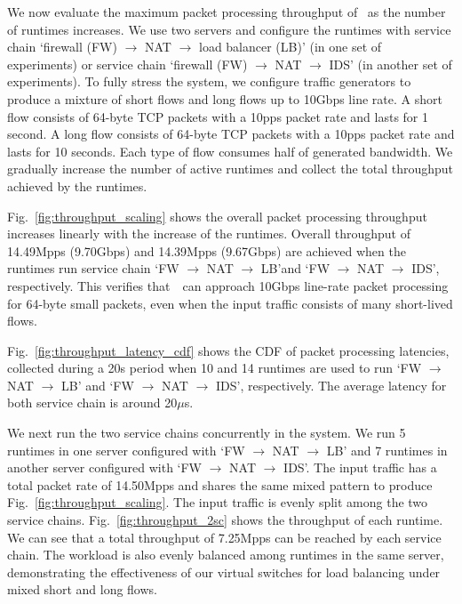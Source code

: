 We now evaluate the maximum packet processing throughput of \nfactor~as the number of runtimes increases. We use two servers and configure the runtimes with service chain `firewall (FW) $\rightarrow$ NAT $\rightarrow$ load balancer (LB)' (in one set of experiments) or service chain `firewall (FW) $\rightarrow$ NAT $\rightarrow$ IDS' (in another set of experiments). To fully stress the system, we configure traffic generators to produce a mixture of short flows and long flows up to 10Gbps line rate. A short flow consists of 64-byte TCP packets with a 10pps packet rate and lasts for 1 second. A long flow consists of 64-byte TCP packets with a 10pps packet rate and lasts for 10 seconds. Each type of flow consumes half of generated bandwidth. We gradually increase the number of active runtimes and collect the total throughput achieved by the runtimes.

Fig.~\ref{fig:throughput_scaling} shows the overall packet processing throughput increases linearly with the increase of the runtimes. Overall throughput of 14.49Mpps (9.70Gbps) and 14.39Mpps (9.67Gbps) are achieved when the runtimes run service chain `FW $\rightarrow$ NAT $\rightarrow$ LB'and `FW $\rightarrow$ NAT $\rightarrow$ IDS', respectively.
This verifies that~\nfactor~can approach 10Gbps line-rate packet processing for 64-byte small packets, even when the input traffic consists of many short-lived flows. %

Fig.~\ref{fig:throughput_latency_cdf} shows the CDF of packet processing latencies, collected during a 20s period when 10 and 14 runtimes are used to run `FW $\rightarrow$ NAT $\rightarrow$ LB' and `FW $\rightarrow$ NAT $\rightarrow$ IDS', respectively. The average latency for both service chain is around 20$\mu$s.

We next run the two service chains concurrently in the system. We run 5 runtimes in one server configured with `FW $\rightarrow$ NAT $\rightarrow$ LB' and 7 runtimes in another server configured with `FW $\rightarrow$ NAT $\rightarrow$ IDS'. The input traffic has a total packet rate of 14.50Mpps and shares the same mixed pattern to produce Fig.~\ref{fig:throughput_scaling}. The input traffic is evenly split among the two service chains. Fig.~\ref{fig:throughput_2sc} shows the throughput of each runtime. We can see that a total throughput of 7.25Mpps can be reached by each service chain. The workload is also evenly balanced among runtimes in the same server, demonstrating the effectiveness of our virtual switches for load balancing under mixed short and long flows.

